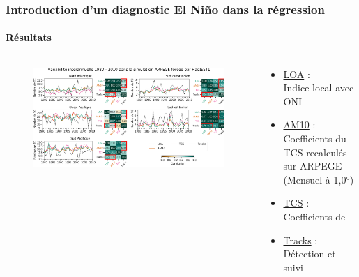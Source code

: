 \documentclass[aspectratio=169, usepdftitle=false, xcolor={dvipsnames}, 9pt,table]{beamer}
\begin{document}
\begin{frame}[t]
    \frametitle{Introduction d'un diagnostic El Niño dans la régression}
    \framesubtitle{Résultats}
    \vspace{-1em}
    \begin{columns}
        \begin{column}{0.8\textwidth}
            \begin{figure}
                \centering
                \includegraphics[width=\textwidth]{Figures/apport_ONI.png}
            \end{figure}
        \end{column}
        \begin{column}{0.2\textwidth}
            \scriptsize
            \begin{examples}
                \setlength{\leftmargini}{2.5ex}
                \begin{itemize}
                    \item \underline{LOA} :\\Indice \alert{local} avec ONI
                    \item \underline{AM10} :\\Coefficients du TCS recalculés sur ARPEGE (Mensuel à 1,0°)
                    \item \underline{TCS} :\\Coefficients de \cite{tippett_poisson_2011}
                    \item \underline{Tracks} :\\Détection et suivi
                \end{itemize}
            \end{examples}

\end{column}
\end{columns}
\end{frame}
\end{document}
